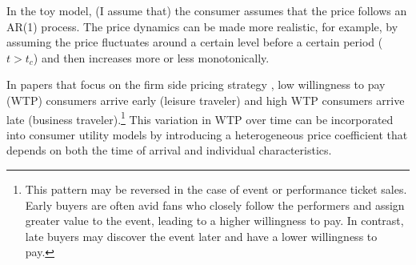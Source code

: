 \documentclass[12pt]{article}
\begin{document}
In the toy model, (I assume that) the consumer assumes that the price follows
an AR(1) process. The price dynamics can be made more realistic, for example,
by assuming the price fluctuates around a certain level before a certain period
($t>t_c$) and then increases more or less monotonically.

In papers that focus on the firm side pricing strategy \citep{}, low
willingness to pay (WTP) consumers arrive early (leisure traveler) and high WTP
consumers arrive late (business traveler).\footnote{This pattern may be
    reversed in the case of event or performance ticket sales. Early buyers are
    often avid fans who closely follow the performers and assign greater value to
    the event, leading to a higher willingness to pay. In contrast, late buyers may
    discover the event later and have a lower willingness to pay.} This variation
in WTP over time can be incorporated into consumer utility models by
introducing a heterogeneous price coefficient that depends on both the time of
arrival and individual characteristics.

\pagebreak \newpage 
\end{document}
